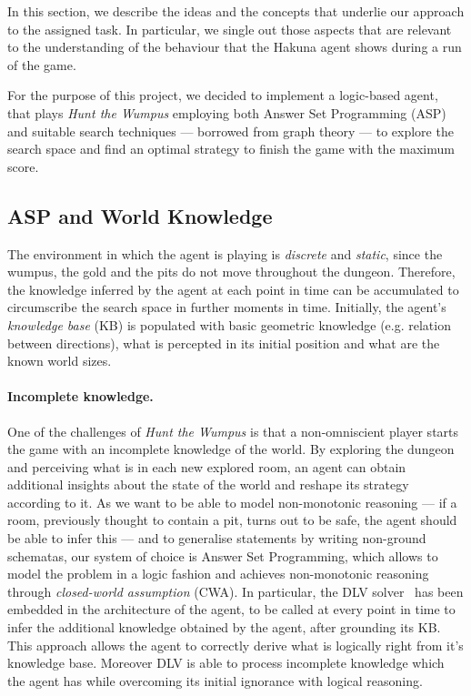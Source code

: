 \documentclass{llncs}
\newcommand{\htw}{\emph{Hunt the Wumpus }}
\begin{document}
In this section, we describe the ideas and the concepts that underlie our approach to the assigned task.
In particular, we single out those aspects that are relevant to the understanding of the behaviour that the Hakuna agent shows during a run of the game.

For the purpose of this project, we decided to implement a logic-based agent, that plays \htw employing both Answer Set Programming (ASP) and suitable search techniques --- borrowed from graph theory --- to explore the search space and find an optimal strategy to finish the game with the maximum score.

\subsection{ASP and World Knowledge}

The environment in which the agent is playing is \emph{discrete} and \emph{static}, since the wumpus, the gold and the pits do not move throughout the dungeon.
Therefore, the knowledge inferred by the agent at each point in time can be accumulated to circumscribe the search space in further moments in time.
Initially, the agent's \emph{knowledge base} (KB) is populated with basic geometric knowledge (e.g. relation between directions), what is percepted in its initial position and what are the known world sizes.

\paragraph{Incomplete knowledge.} One of the challenges of \htw is that a non-omniscient player starts the game with an incomplete knowledge of the world.
By exploring the dungeon and perceiving what is in each new explored room, an agent can obtain additional insights about the state of the world and reshape its strategy according to it.
As we want to be able to model non-monotonic reasoning --- if a room, previously thought to contain a pit, turns out to be safe, the agent should be able to infer this --- and to generalise statements by writing non-ground schematas, our system of choice is Answer Set Programming, which allows to model the problem in a logic fashion and achieves non-monotonic reasoning through \emph{closed-world assumption} (CWA).
In particular, the DLV solver~\cite{DLV-system} has been embedded in the architecture of the agent, to be called at every point in time to infer the additional knowledge obtained by the agent, after grounding its KB.
This approach allows the agent to correctly derive what is logically right from it's knowledge base. Moreover DLV is able to process incomplete knowledge which the agent has while overcoming its initial ignorance with logical reasoning.
\end{document}
